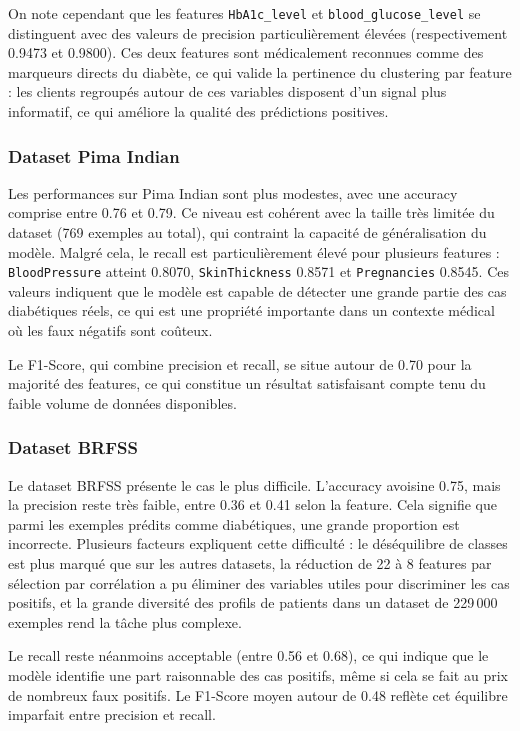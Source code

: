 \documentclass[12pt,a4paper]{article}
\begin{document}
On note cependant que les features \texttt{HbA1c\_level} et \texttt{blood\_glucose\_level} se distinguent avec des valeurs de precision particulièrement élevées (respectivement 0.9473 et 0.9800). Ces deux features sont médicalement reconnues comme des marqueurs directs du diabète, ce qui valide la pertinence du clustering par feature : les clients regroupés autour de ces variables disposent d'un signal plus informatif, ce qui améliore la qualité des prédictions positives.

\subsubsection*{Dataset Pima Indian}

Les performances sur Pima Indian sont plus modestes, avec une accuracy comprise entre 0.76 et 0.79. Ce niveau est cohérent avec la taille très limitée du dataset (769 exemples au total), qui contraint la capacité de généralisation du modèle. Malgré cela, le recall est particulièrement élevé pour plusieurs features : \texttt{BloodPressure} atteint 0.8070, \texttt{SkinThickness} 0.8571 et \texttt{Pregnancies} 0.8545. Ces valeurs indiquent que le modèle est capable de détecter une grande partie des cas diabétiques réels, ce qui est une propriété importante dans un contexte médical où les faux négatifs sont coûteux.

Le F1-Score, qui combine precision et recall, se situe autour de 0.70 pour la majorité des features, ce qui constitue un résultat satisfaisant compte tenu du faible volume de données disponibles.

\subsubsection*{Dataset BRFSS}

Le dataset BRFSS présente le cas le plus difficile. L'accuracy avoisine 0.75, mais la precision reste très faible, entre 0.36 et 0.41 selon la feature. Cela signifie que parmi les exemples prédits comme diabétiques, une grande proportion est incorrecte. Plusieurs facteurs expliquent cette difficulté : le déséquilibre de classes est plus marqué que sur les autres datasets, la réduction de 22 à 8 features par sélection par corrélation a pu éliminer des variables utiles pour discriminer les cas positifs, et la grande diversité des profils de patients dans un dataset de 229\,000 exemples rend la tâche plus complexe.

Le recall reste néanmoins acceptable (entre 0.56 et 0.68), ce qui indique que le modèle identifie une part raisonnable des cas positifs, même si cela se fait au prix de nombreux faux positifs. Le F1-Score moyen autour de 0.48 reflète cet équilibre imparfait entre precision et recall.
\end{document}
